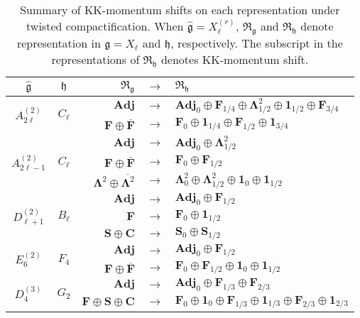 \begin{table}
	\centering
	\begin{tabular}{|c|c|rcl|} \hline
		$ \hat{\mathfrak{g}} $ & $ \mathfrak{h} $ & $ \mathfrak{R}_{\mathfrak{g}} $ & $ \to $ & $ \mathfrak{R}_{\mathfrak{h}} $  \\ \hline
		\multirow{2}{*}{$ A_{2\ell}^{(2)} $} & \multirow{2}{*}{$ C_\ell $} & $ \mathbf{Adj} $ & $ \to $ & $ \mathbf{Adj}_0 \oplus \mathbf{F}_{1/4} \oplus \mathbf{\Lambda}^2_{1/2} \oplus \mathbf{1}_{1/2} \oplus \mathbf{F}_{3/4}  $ \\ 
		& & $ \mathbf{F} \oplus \overline{\mathbf{F}} $ & $ \to $ & $ \mathbf{F}_0 \oplus \mathbf{1}_{1/4} \oplus \mathbf{F}_{1/2} \oplus \mathbf{1}_{3/4} $ \\ \hline
		\multirow{3}{*}{$ A_{2\ell-1}^{(2)} $} & \multirow{3}{*}{$ C_\ell $} & $ \mathbf{Adj} $ & $ \to $ & $ \mathbf{Adj}_0 \oplus \mathbf{\Lambda}^2_{1/2} $ \\
		& & $ \mathbf{F} \oplus \overline{\mathbf{F}} $ & $ \to $ & $ \mathbf{F}_{0} \oplus \mathbf{F}_{1/2} $ \\
		& & $ \mathbf{\Lambda}^2 \oplus \overline{\mathbf{\Lambda}^2} $ & $ \to $ & $ \mathbf{\Lambda}^2_0 \oplus \mathbf{\Lambda}^2_{1/2} \oplus \mathbf{1}_0 \oplus \mathbf{1}_{1/2} $ \\ \hline
		\multirow{3}{*}{$ D_{\ell+1}^{(2)} $} & \multirow{3}{*}{$ B_\ell $} & $ \mathbf{Adj} $ & $ \to $ & $ \mathbf{Adj}_0 \oplus \mathbf{F}_{1/2} $ \\
		& & $ \mathbf{F} $ & $ \to $ &$ \mathbf{F}_0 \oplus \mathbf{1}_{1/2} $ \\
		& & $ \mathbf{S} \oplus \mathbf{C} $ & $ \to $ & $ \mathbf{S}_0 \oplus \mathbf{S}_{1/2} $ \\ \hline
		\multirow{2}{*}{$ E_6^{(2)} $} & \multirow{2}{*}{$ F_4 $} & $ \mathbf{Adj} $ & $ \to $ & $ \mathbf{Adj}_0 \oplus \mathbf{F}_{1/2} $ \\
		& & $ \mathbf{F} \oplus \overline{\mathbf{F}} $ & $ \to $ & $ \mathbf{F}_0 \oplus \mathbf{F}_{1/2} \oplus \mathbf{1}_0 \oplus \mathbf{1}_{1/2} $ \\ \hline
		\multirow{2}{*}{$ D_4^{(3)} $} & \multirow{2}{*}{$ G_2 $} & $ \mathbf{Adj} $ & $ \to $ & $ \mathbf{Adj}_0 \oplus \mathbf{F}_{1/3} \oplus \mathbf{F}_{2/3} $ \\
		& & $ \mathbf{F} \oplus \mathbf{S} \oplus \mathbf{C} $ & $ \to $ & $ \mathbf{F}_0 \oplus \mathbf{1}_0 \oplus \mathbf{F}_{1/3} \oplus \mathbf{1}_{1/3} \oplus \mathbf{F}_{2/3} \oplus  \mathbf{1}_{2/3} $ \\ \hline
	\end{tabular}
	\caption{Summary of KK-momentum shifts on each representation under twisted compactification. When $ \hat{\mathfrak{g}} = X_\ell^{(r)} $, $ \mathfrak{R}_\mathfrak{g} $ and $ \mathfrak{R}_\mathfrak{h} $ denote representation in $ \mathfrak{g} = X_\ell $ and $ \mathfrak{h} $, respectively. The subscript in the representations of $ \mathfrak{R}_{\mathfrak{h}} $ denotes KK-momentum shift.}\label{table:affine_KK}
\end{table}



